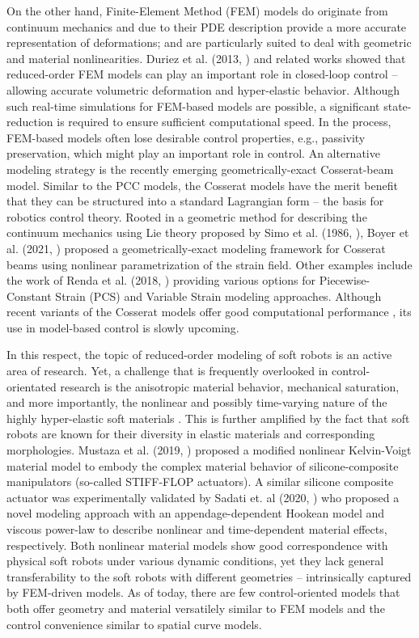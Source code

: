 On the other hand, Finite-Element Method (FEM) models do originate from continuum mechanics and due to their PDE description provide a more accurate representation of deformations; and are particularly suited to deal with geometric and material nonlinearities. Duriez et al. (2013, \cite{Duriez2013}) and related works \cite{Coevoet2017,Largilliere2015,Goury2018} showed that reduced-order FEM models can play an important role in closed-loop control -- allowing accurate volumetric deformation and hyper-elastic behavior. Although such real-time simulations for FEM-based models are possible, a significant state-reduction is required to ensure sufficient computational speed. In the process, FEM-based models often lose desirable control properties, e.g., passivity preservation, which might play an important role in control. An alternative modeling strategy is the recently emerging geometrically-exact Cosserat-beam model. Similar to the PCC models, the Cosserat models have the merit benefit that they can be structured into a standard Lagrangian form -- the basis for robotics control theory. Rooted in a geometric method for describing the continuum mechanics using Lie theory proposed by Simo et al. (1986, \cite{Simo1986}), Boyer et al. (2021, \cite{Boyer2010, Boyer2021}) proposed a geometrically-exact modeling framework for Cosserat beams using nonlinear parametrization of the strain field. Other examples include the work of Renda et al. (2018, \cite{Renda2018,Renda2020}) providing various options for Piecewise-Constant Strain (PCS) and Variable Strain modeling approaches. Although recent variants of the Cosserat models offer good computational performance \cite{Till2019,Grazioso2019}, its use in model-based control is slowly upcoming.

In this respect, the topic of reduced-order modeling of soft robots is an active area of research. Yet, a challenge that is frequently overlooked in control-orientated research is the anisotropic material behavior, mechanical saturation, and more importantly, the nonlinear and possibly time-varying nature of the highly hyper-elastic soft materials \cite{Falkenhahn2015, Mochiyama2003, Till2019, Tatlicioglu2007}. This is further amplified by the fact that soft robots are known for their diversity in elastic materials and corresponding morphologies. Mustaza et al. (2019, \cite{Mustaza2019}) proposed a modified nonlinear Kelvin-Voigt material model to embody the complex material behavior of silicone-composite manipulators (so-called STIFF-FLOP actuators). A similar silicone composite actuator was experimentally validated by Sadati et. al (2020, \cite{Sadati2020}) who proposed a novel modeling approach with an appendage-dependent Hookean model and viscous power-law to describe nonlinear and time-dependent material effects, respectively. Both nonlinear material models show good correspondence with physical soft robots under various dynamic conditions, yet they lack general transferability to the soft robots with different geometries -- intrinsically captured by FEM-driven models. As of today, there are few control-oriented models that both offer geometry and material versatilely similar to FEM models and the control convenience similar to spatial curve models.


